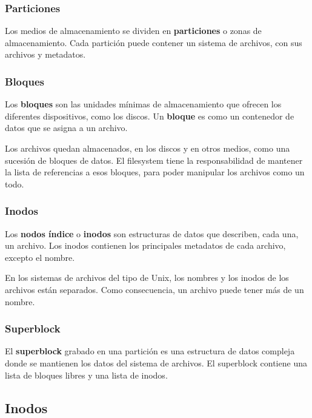 \documentclass[spanish,A4,]{article}
\begin{document}
\subsubsection{Particiones}\label{particiones}

Los medios de almacenamiento se dividen en \textbf{particiones} o zonas
de almacenamiento. Cada partición puede contener un sistema de archivos,
con sus archivos y metadatos.

\subsubsection{Bloques}\label{bloques}

Los \textbf{bloques} son las unidades mínimas de almacenamiento que
ofrecen los diferentes dispositivos, como los discos. Un \textbf{bloque}
es como un contenedor de datos que se asigna a un archivo.

Los archivos quedan almacenados, en los discos y en otros medios, como
una sucesión de bloques de datos. El filesystem tiene la responsabilidad
de mantener la lista de referencias a esos bloques, para poder manipular
los archivos como un todo.

\subsubsection{Inodos}\label{inodos}

Los \textbf{nodos índice} o \textbf{inodos} son estructuras de datos que
describen, cada una, un archivo. Los inodos contienen los principales
metadatos de cada archivo, excepto el nombre.

En los sistemas de archivos del tipo de Unix, los nombres y los inodos
de los archivos están separados. Como consecuencia, un archivo puede
tener más de un nombre.

\subsubsection{Superblock}\label{superblock}

El \textbf{superblock} grabado en una partición es una estructura de
datos compleja donde se mantienen los datos del sistema de archivos. El
superblock contiene una lista de bloques libres y una lista de inodos.

\subsection{Inodos}\label{inodos-1}
\end{document}

